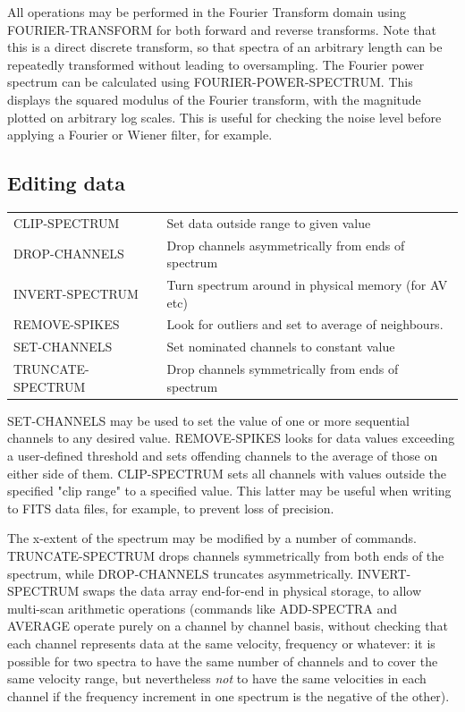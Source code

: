 \documentclass[11pt,twoside]{report}
\begin{document}
All operations may be performed in the Fourier Transform  domain using
FOURIER-TRANSFORM for both forward and reverse transforms. Note that this is a
direct discrete transform, so that spectra of an arbitrary length can be
repeatedly transformed without leading to oversampling. The Fourier power
spectrum can be calculated using FOURIER-POWER-SPECTRUM.  This displays the squared modulus of the Fourier
transform, with the magnitude plotted on arbitrary log scales. This is useful
for checking the noise level before applying a Fourier or Wiener filter, for
  example.

\subsection{Editing data} 

\begin{tabular}{ll}
CLIP-SPECTRUM            & Set data outside range to given value\\
DROP-CHANNELS            & Drop channels asymmetrically from ends of spectrum\\
INVERT-SPECTRUM          & Turn spectrum around in physical memory (for AV etc)\\
REMOVE-SPIKES            & Look for outliers and set to average of neighbours.\\
SET-CHANNELS             & Set nominated channels to constant value\\
TRUNCATE-SPECTRUM        & Drop channels symmetrically from ends of spectrum\\
\end{tabular}


SET-CHANNELS may be used to set the value of one or more sequential channels
to any desired value. REMOVE-SPIKES looks for data values exceeding a user-defined
threshold and sets offending channels to the average of those on either side
of them. CLIP-SPECTRUM sets all channels with values outside the specified
"clip range" to a specified value. This latter may be useful when writing to
FITS data files, for example, to prevent loss of precision.

The x-extent of the spectrum may be modified by a number of commands.
TRUNCATE-SPECTRUM drops channels symmetrically from both ends of the spectrum,
while DROP-CHANNELS truncates asymmetrically.
INVERT-SPECTRUM swaps the data array end-for-end in physical storage, to allow
multi-scan arithmetic operations (commands like ADD-SPECTRA and AVERAGE operate
 
purely on a channel by channel basis, without checking that each channel
represents data at the same velocity, frequency or whatever: it is possible for
two spectra to have the same number of channels and to cover the same velocity
range, but nevertheless {\em not} to have the same velocities in each channel
if the frequency increment in one spectrum is the negative of the other).
\end{document}
